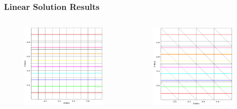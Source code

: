 \documentclass[]{beamer}
\begin{document}
\begin{frame}[t]\frametitle{Linear Solution Results}
    	\begin{columns}
		\begin{column}{.5\textwidth}
			\begin{figure}[t]
				\centering
				\includegraphics[width=.9\textwidth]{images/cart_lin_contour.png}
			\end{figure}
		\end{column}
		\begin{column}{.5\textwidth}
			\begin{figure}[t]
				\centering
				\includegraphics[width=.9\textwidth]{images/tri_lin_contour.png}
			\end{figure}
		\end{column}
	\end{columns}
\end{frame}
\end{document}
